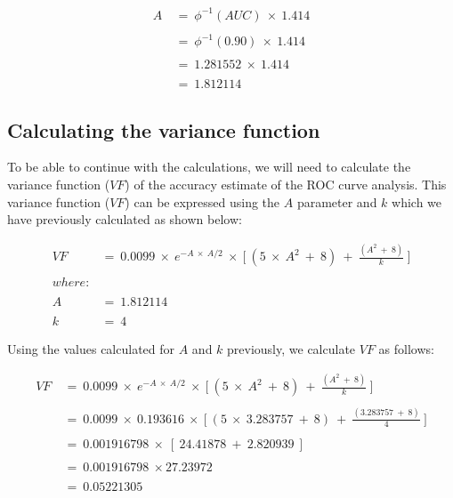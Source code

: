 \documentclass[12pt,a4paper]{article}
\theoremstyle{definition}
\theoremstyle{definition}
\theoremstyle{definition}
\theoremstyle{remark}
\begin{document}
\[ \begin{aligned}
A ~ & = ~ \phi ^ {-1}(AUC) ~ \times ~ 1.414 \\
\\
& = ~ \phi ^ {-1}(0.90) ~ \times ~ 1.414 \\
\\
& = ~ 1.281552 ~ \times ~ 1.414 \\
\\
& = ~ 1.812114
\end{aligned} \]

\hypertarget{calculating-the-variance-function}{%
\subsection{Calculating the variance
function}\label{calculating-the-variance-function}}

To be able to continue with the calculations, we will need to calculate
the variance function (\(VF\)) of the accuracy estimate of the ROC curve
analysis. This variance function (\(VF\)) can be expressed using the
\(A\) parameter and \(k\) which we have previously calculated as shown
below:

\[ \begin{aligned}
VF ~ & = ~ 0.0099 ~ \times ~ e ^ {-A ~ \times ~ A/2} ~ \times ~ \Bigg [ ~ (5 ~ \times ~ A ^ 2 ~ + ~ 8) ~ + ~ \frac{(A ^ 2 ~ + ~ 8)}{k} ~ \Bigg ] \\
\\
where: & \\
\\
A ~ & = ~ 1.812114 \\
\\
k ~ & = ~ 4
\end{aligned}\]

Using the values calculated for \(A\) and \(k\) previously, we calculate
\(VF\) as follows:

\[ \begin{aligned}
VF ~ & = ~ 0.0099 ~ \times ~ e ^ {-A ~ \times ~ A/2} ~ \times ~ \Bigg [ ~ (5 ~ \times ~ A ^ 2 ~ + ~ 8) ~ + ~ \frac{(A ^ 2 ~ + ~ 8)}{k} ~ \Bigg ] \\
\\
& = ~ 0.0099 ~ \times ~ 0.193616 ~ \times ~ \Bigg [ ~ (5 ~ \times ~ 3.283757 ~ + ~ 8) ~ + ~ \frac{(3.283757 ~ + ~ 8)}{4} ~ \Bigg ] \\
\\
& = ~ 0.001916798 ~ \times ~ [ ~ 24.41878 ~ + ~ 2.820939 ~] \\
\\
& = ~ 0.001916798 ~ \times 27.23972 \\
\\
& = ~ 0.05221305
\end{aligned} \]
\end{document}
